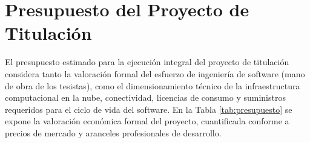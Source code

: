 \section{Presupuesto del Proyecto de Titulación}

El presupuesto estimado para la ejecución integral del proyecto de titulación considera tanto la valoración formal del esfuerzo de ingeniería de software (mano de obra de los tesistas), como el dimensionamiento técnico de la infraestructura computacional en la nube, conectividad, licencias de consumo y suministros requeridos para el ciclo de vida del software. En la Tabla \ref{tab:presupuesto} se expone la valoración económica formal del proyecto, cuantificada conforme a precios de mercado y aranceles profesionales de desarrollo.

